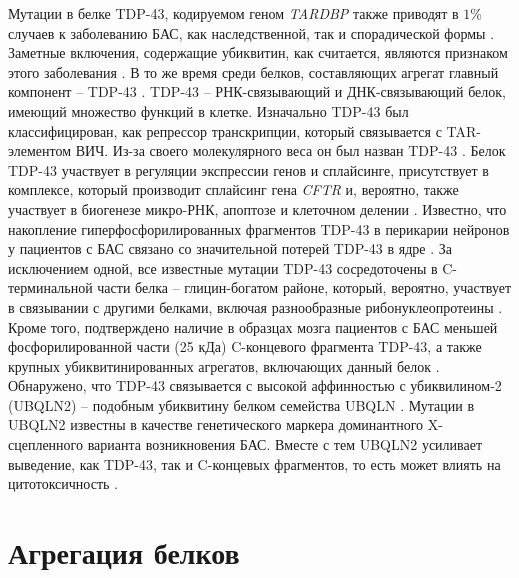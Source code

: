 Мутации в белке TDP-43, кодируемом геном \textit{TARDBP} также приводят в $1$\% случаев к заболеванию БАС, как наследственной, так и спорадической формы \cite{Corrado2009}. Заметные включения, содержащие убиквитин, как считается, являются признаком этого заболевания \cite{Kabashi2008,VanDeerlin2008}. В то же время среди белков, составляющих агрегат главный компонент -- TDP-43 \cite{Sreedharan2008,Kabashi2008,Kuhnlein2008}. TDP-43 -- РНК-связывающий и ДНК-связывающий белок, имеющий множество функций в клетке. Изначально TDP-43 был классифицирован, как репрессор транскрипции, который связывается с TAR-элементом ВИЧ. Из-за своего молекулярного веса он был назван TDP-43 \cite{VanDeerlin2008}. Белок TDP-43 участвует в регуляции экспрессии генов и сплайсинге, присутствует в комплексе, который производит сплайсинг гена \textit{CFTR} и, вероятно, также участвует в биогенезе микро-РНК, апоптозе и клеточном делении \cite{Sreedharan2008,VanDeerlin2008}. Известно, что накопление гиперфосфорилированных фрагментов TDP-43 в перикарии нейронов у пациентов с БАС связано со значительной потерей TDP-43 в ядре \cite{Sreedharan2008}. За исключением одной, все известные мутации TDP-43 сосредоточены в C-терминальной части белка -- глицин-богатом районе, который, вероятно, участвует в связывании с другими белками, включая разнообразные рибонуклеопротеины \cite{Corrado2009}. Кроме того, подтверждено наличие в образцах мозга пациентов с БАС меньшей фосфорилированной части (25 кДа) C-концевого фрагмента TDP-43, а также крупных убиквитинированных агрегатов, включающих данный белок \cite{Corrado2009}. Обнаружено, что TDP-43 связывается с высокой аффинностью с убиквилином-2 (UBQLN2) -- подобным убиквитину белком семейства UBQLN \cite{Cassel2013}. Мутации в UBQLN2 известны в качестве генетического маркера доминантного X-сцепленного варианта возникновения БАС. Вместе с тем UBQLN2 усиливает выведение, как TDP-43, так и C-концевых фрагментов, то есть может влиять на цитотоксичность \cite{Cassel2013}.


\section{Агрегация белков} \label{sect_aggregation}

